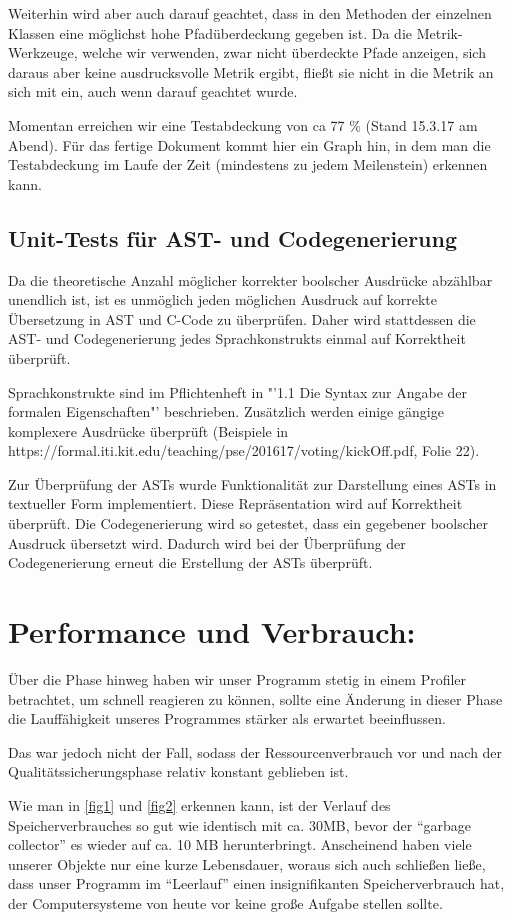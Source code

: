 \documentclass[a4paper]{scrreprt}
\begin{document}
Weiterhin wird aber auch darauf geachtet, dass in den Methoden der einzelnen Klassen eine möglichst hohe
Pfadüberdeckung gegeben ist. Da die Metrik-Werkzeuge, welche wir verwenden, zwar
nicht überdeckte Pfade anzeigen, sich daraus aber keine ausdrucksvolle Metrik ergibt, fließt sie nicht in die Metrik an sich mit ein, auch wenn darauf
geachtet wurde.

Momentan erreichen wir eine Testabdeckung von ca 77 \% (Stand 15.3.17 am Abend).
Für das fertige Dokument kommt hier ein Graph hin, in dem man die Testabdeckung
im Laufe der Zeit (mindestens zu jedem Meilenstein) erkennen kann.

\section{Unit-Tests für AST- und Codegenerierung}
Da die theoretische Anzahl möglicher korrekter boolscher Ausdrücke abzählbar unendlich ist, ist es unmöglich jeden möglichen Ausdruck auf korrekte Übersetzung in AST und C-Code zu überprüfen. Daher wird stattdessen die AST- und Codegenerierung jedes Sprachkonstrukts einmal auf Korrektheit überprüft. 

Sprachkonstrukte sind im Pflichtenheft in "'1.1 Die Syntax zur Angabe der formalen Eigenschaften"' beschrieben. Zusätzlich werden einige gängige komplexere Ausdrücke überprüft (Beispiele in https://formal.iti.kit.edu/teaching/pse/201617/voting/kickOff.pdf, Folie 22). 

Zur Überprüfung der ASTs wurde Funktionalität zur Darstellung eines ASTs in textueller Form implementiert. Diese Repräsentation wird auf Korrektheit überprüft. Die Codegenerierung wird so getestet, dass ein gegebener boolscher Ausdruck übersetzt wird. Dadurch wird bei der Überprüfung der Codegenerierung erneut die Erstellung der ASTs überprüft. 

\chapter{Performance und Verbrauch:}
Über die Phase hinweg haben wir unser Programm stetig in einem Profiler betrachtet, um
schnell reagieren zu können, sollte eine Änderung in dieser Phase die
Lauffähigkeit unseres Programmes stärker als erwartet beeinflussen.

Das war jedoch nicht der Fall, sodass der Ressourcenverbrauch vor und nach der
Qualitätssicherungsphase relativ konstant geblieben ist.

Wie man in \ref{fig1} und \ref{fig2} erkennen kann, ist der Verlauf des
Speicherverbrauches so gut wie identisch mit ca. 30MB, bevor der "`garbage
collector"' es wieder auf ca. 10 MB herunterbringt. Anscheinend haben viele
unserer Objekte nur eine kurze Lebensdauer, woraus sich auch schließen ließe,
dass unser Programm im "`Leerlauf"' einen insignifikanten Speicherverbrauch hat,
der Computersysteme von heute vor keine große Aufgabe stellen sollte.
\end{document}
